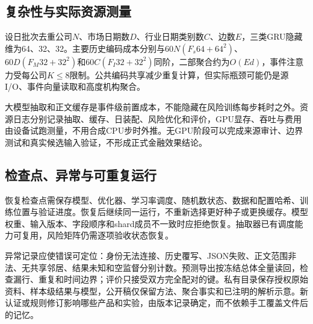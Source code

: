 \subsection{复杂性与实际资源测量}
设日批次去重公司$N$、市场日期数$D$、行业日期类别数$C$、边数$E$，三类GRU隐藏维为64、32、32。主要历史编码成本分别与$60N(F_s64+64^2)$、$60D(F_M32+32^2)$和$60C(F_I32+32^2)$同阶，二部聚合约为$O(Ed)$，事件注意力受每公司$K\le8$限制。公共编码共享减少重复计算，但实际瓶颈可能仍是源I/O、事件向量读取和高度机构聚合。

大模型抽取和正文缓存是事件级前置成本，不能隐藏在风险训练每步耗时之外。资源日志分别记录抽取、缓存、日装配、风险优化和评价，GPU显存、吞吐与费用由设备试跑测量，不用合成CPU步时外推。无GPU阶段可以完成来源审计、边界测试和真实候选输入验证，不形成正式金融效果结论。

\subsection{检查点、异常与可重复运行}
恢复检查点需保存模型、优化器、学习率调度、随机数状态、数据和配置哈希、训练位置与验证进度。恢复后继续同一运行，不重新选择更好种子或更换缓存。模型权重、输入版本、字段顺序和shard成员不一致时应拒绝恢复。抽取器已有调度能力可复用，风险矩阵仍需逐项验收状态恢复。

异常记录应使错误可定位：身份无法连接、历史覆写、JSON失败、正文范围非法、无共享邻居、结果未知和空监督分别计数。预测导出按冻结总体全量读回，检查漏行、重复和时间边界；评价只接受双方完全配对的键。私有目录保存授权原始资料、样本级结果与模型，公开稿仅保留方法、聚合事实和已注明的解析示意。新认证或规则修订影响哪些产品和实验，由版本记录确定，而不依赖手工覆盖文件后的记忆。

